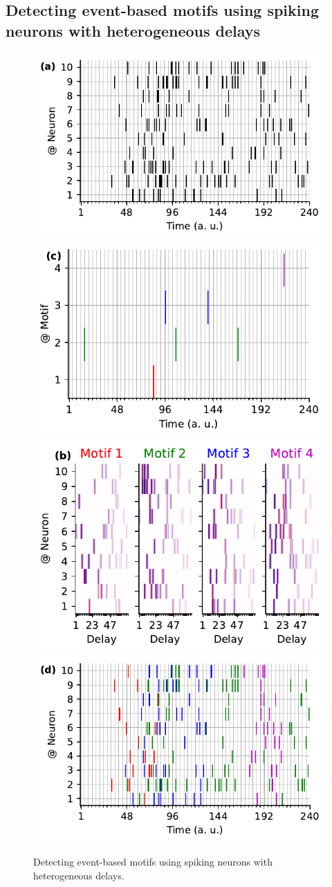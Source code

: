 \documentclass[default]{sn-jnl}%
\theoremstyle{thmstyleone}%
\theoremstyle{thmstyletwo}%
\theoremstyle{thmstylethree}%
\begin{document}
\subsection{Detecting event-based motifs using spiking neurons with heterogeneous delays}%
%
\begin{figure}%
    \centering
    \includegraphics[width=0.490\linewidth]{figures/THC_1a_k.pdf}
    \includegraphics[width=0.490\linewidth]{figures/THC_1c.pdf}
    \includegraphics[width=0.490\linewidth]{figures/THC_1b.pdf}
    \includegraphics[width=0.490\linewidth]{figures/THC_1a.pdf}
	    \caption{Detecting event-based motifs using spiking neurons with heterogeneous delays. 
}
\end{figure}
\end{document}
